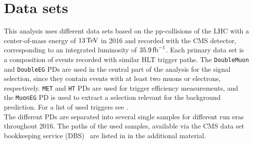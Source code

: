 \section{Data sets}\label{sec:datasets}
This analysis uses different data sets based on the pp-collisions of the LHC with a center-of-mass energy of $13\,\text{Te\hspace{-.08em}V}$ in 2016 and recorded with the CMS detector, corresponding to an integrated luminosity of $35.9\mbox{\ensuremath{\,\text{fb}^\text{$-$1}}}$. Each primary data set is a composition of events recorded with similar HLT trigger paths. The \texttt{DoubleMuon} and \texttt{DoubleEG} PDs are used in the central part of the analysis for the signal selection, since they contain events with at least two muons or electrons, respectively. \texttt{MET} and \texttt{HT} PDs are used for trigger efficiency measurements, and the \texttt{MuonEG} PD is used to extract a selection relevant for the background prediction. For a list of used triggers see .\\
The different PDs are separated into several single samples for different run eras throughout 2016.
The paths of the used samples, available via the CMS data set bookkeeping service (DBS)~\cite{DASBookkeeping} are listed in  in the additional material.




